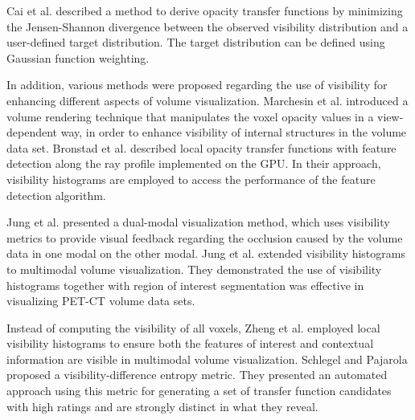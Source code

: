Cai et al. \cite{cai_automatic_2013} described a method to derive opacity transfer functions by minimizing the Jensen-Shannon divergence between the observed visibility distribution and a user-defined target distribution. The target distribution can be defined using Gaussian function weighting.





In addition, various methods were proposed regarding the use of visibility for enhancing different aspects of volume visualization.
Marchesin et al. \cite{marchesin_per-pixel_2010} introduced a volume rendering technique that manipulates the voxel opacity values in a view-dependent way, in order to enhance visibility of internal structures in the volume data set.
Bronstad et al. \cite{bronstad_visibility_2012} described local opacity transfer functions with feature detection along the ray profile implemented on the GPU. In their approach, visibility histograms are employed to access the performance of the feature detection algorithm.

Jung et al. \cite{jung_dual-modal_2012} presented a dual-modal visualization method, which uses visibility metrics to provide visual feedback regarding the occlusion caused by the volume data in one modal on the other modal.
Jung et al. \cite{jung_visibility-driven_2013} extended visibility histograms to multimodal volume visualization.
They demonstrated the use of visibility histograms together with region of interest segmentation was effective in visualizing PET-CT volume data sets.

Instead of computing the visibility of all voxels, Zheng et al. \cite{zheng_visibility_2013} employed local visibility histograms to ensure both the features of interest and contextual information are visible in multimodal volume visualization.
Schlegel and Pajarola \cite{schlegel_visibility-difference_2013} proposed a visibility-difference entropy metric. They presented an automated approach using this metric for generating a set of transfer function candidates with high ratings and are strongly distinct in what they reveal.


